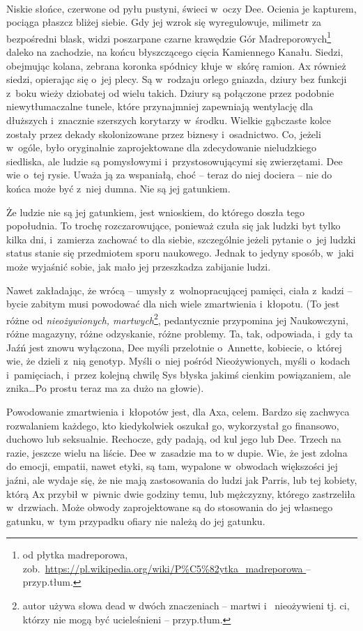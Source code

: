 \documentclass[oneside,polish,11pt,sfheadings]{mwbk}
\begin{document}
~

Niskie słońce, czerwone od pyłu pustyni, świeci w~oczy Dee. Ocienia je
kapturem, pociąga płaszcz bliżej siebie. Gdy jej wzrok się wyregulowuje,
milimetr za bezpośredni blask, widzi poszarpane czarne krawędzie Gór
Madreporowych\footnote{od płytka madreporowa,
zob.~\url{https://pl.wikipedia.org/wiki/P\%C5\%82ytka_madreporowa
} -- przyp.tłum.} daleko na zachodzie, na końcu błyszczącego cięcia
Kamiennego Kanału. Siedzi, obejmując kolana, zebrana koronka spódnicy
kłuje w~skórę ramion. Ax również siedzi, opierając się o~jej plecy. Są w~rodzaju orlego gniazda, dziury bez funkcji z~boku wieży dziobatej od
wielu takich. Dziury są połączone przez podobnie niewytłumaczalne
tunele, które przynajmniej zapewniają wentylację dla dłuższych i~znacznie szerszych korytarzy w~środku. Wielkie gąbczaste kolce zostały
przez dekady skolonizowane przez biznesy i~osadnictwo. Co, jeżeli w~ogóle, było oryginalnie zaprojektowane dla zdecydowanie nieludzkiego
siedliska, ale ludzie są pomysłowymi i~przystosowującymi się
zwierzętami. Dee wie o~tej rysie. Uważa ją za wspaniałą, choć -- teraz do
niej dociera -- nie do końca może być z~niej dumna. Nie są jej gatunkiem.

Że ludzie nie są jej gatunkiem, jest wnioskiem, do którego doszła tego
popołudnia. To trochę rozczarowujące, ponieważ czuła się jak ludzki byt
tylko kilka dni, i~zamierza zachować to dla siebie, szczególnie jeżeli
pytanie o~jej ludzki status stanie się przedmiotem sporu naukowego.
Jednak to jedyny sposób, w~jaki może wyjaśnić sobie, jak mało jej
przeszkadza zabijanie ludzi.

Nawet zakładając, że wrócą -- umysły z~wolnopracującej pamięci, ciała z~kadzi -- bycie zabitym musi powodować dla nich wiele zmartwienia i~kłopotu. (To jest różne od \emph{nieożywionych, martwych}\footnote{autor używa słowa dead w dwóch znaczeniach -- martwi i~ nieożywieni tj. ci, którzy nie mogą być ucieleśnieni  -- przyp.tłum.}, pedantycznie
przypomina jej Naukowczyni, różne magazyny, różne odzyskanie, różne
problemy. 
Ta, tak, odpowiada, i~gdy ta Jaźń jest znowu wyłączona, Dee myśli
przelotnie o~Annette, kobiecie, o~której wie, że dzieli z~nią genotyp.
Myśli o~niej pośród Nieożywionych, myśli o~kodach i~pamięciach, i~przez
kolejną chwilę Sys błyska jakimś cienkim powiązaniem, ale znika\ldots Po
prostu teraz ma za dużo na głowie).

Powodowanie zmartwienia i~kłopotów jest, dla Axa, celem. Bardzo się
zachwyca rozwalaniem każdego, kto kiedykolwiek oszukał go, wykorzystał
go finansowo, duchowo lub seksualnie. Rechocze, gdy padają, od kul jego
lub Dee. Trzech na razie, jeszcze wielu na liście. Dee w~zasadzie ma to
w dupie. Wie, że jest zdolna do emocji, empatii, nawet etyki, są tam,
wypalone w~obwodach większości jej jaźni, ale wydaje się, że nie mają
zastosowania do ludzi jak Parris, lub tej kobiety, którą Ax przybił w~piwnic dwie godziny temu, lub mężczyzny, którego zastrzeliła w~drzwiach.
Może obwody zaprojektowane są do stosowania do jej własnego gatunku, w~tym przypadku ofiary nie należą do jej gatunku.
\end{document}
